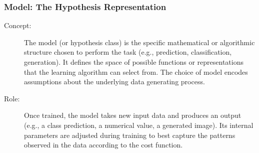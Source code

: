 \documentclass{article}
\begin{document}
\subsubsection{Model: The Hypothesis Representation}
\begin{description}
    \item[Concept:] The model (or hypothesis class) is the specific mathematical or algorithmic structure chosen to perform the task (e.g., prediction, classification, generation). It defines the space of possible functions or representations that the learning algorithm can select from. The choice of model encodes assumptions about the underlying data generating process.

    \item[Role:] Once trained, the model takes new input data and produces an output (e.g., a class prediction, a numerical value, a generated image). Its internal parameters are adjusted during training to best capture the patterns observed in the data according to the cost function.


\end{description}
\end{document}
